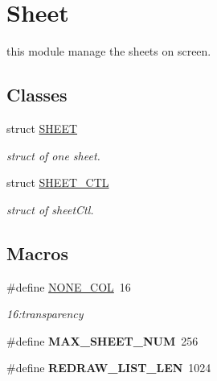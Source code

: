 \hypertarget{group__sheet}{}\section{Sheet}
\label{group__sheet}


this module manage the sheets on screen.  


\subsection*{Classes}
\begin{DoxyCompactItemize}
\item 
struct \hyperlink{struct_s_h_e_e_t}{S\+H\+E\+E\+T}
\begin{DoxyCompactList}\small\item\em struct of one sheet. \end{DoxyCompactList}\item 
struct \hyperlink{struct_s_h_e_e_t___c_t_l}{S\+H\+E\+E\+T\+\_\+\+C\+T\+L}
\begin{DoxyCompactList}\small\item\em struct of sheet\+Ctl. \end{DoxyCompactList}\end{DoxyCompactItemize}
\subsection*{Macros}
\begin{DoxyCompactItemize}
\item 
\hypertarget{group__sheet_ga0e65d9c3f578acfc5f9209eaf934b5c9}{}\#define \hyperlink{group__sheet_ga0e65d9c3f578acfc5f9209eaf934b5c9}{N\+O\+N\+E\+\_\+\+C\+O\+L}~16\label{group__sheet_ga0e65d9c3f578acfc5f9209eaf934b5c9}

\begin{DoxyCompactList}\small\item\em 16\+:transparency \end{DoxyCompactList}\item 
\hypertarget{group__sheet_ga0bb9b527356bd0bd7199718d7e0c9d22}{}\#define {\bfseries M\+A\+X\+\_\+\+S\+H\+E\+E\+T\+\_\+\+N\+U\+M}~256\label{group__sheet_ga0bb9b527356bd0bd7199718d7e0c9d22}

\item 
\hypertarget{group__sheet_ga3445327e784e197b0568bfb7bb3765cb}{}\#define {\bfseries R\+E\+D\+R\+A\+W\+\_\+\+L\+I\+S\+T\+\_\+\+L\+E\+N}~1024\label{group__sheet_ga3445327e784e197b0568bfb7bb3765cb}

\end{DoxyCompactItemize}
